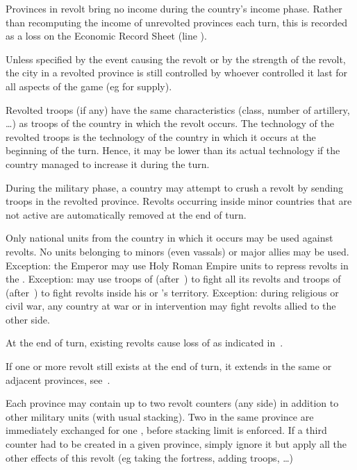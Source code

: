  Provinces in revolt bring no income during the
country's income phase. Rather than recomputing the income of unrevolted
provinces each turn, this is recorded as a loss on the Economic Record Sheet
(line ).

 Unless specified by the event causing the revolt or by
the strength of the revolt, the city in a revolted province is still
controlled by whoever controlled it last for all aspects of the game (eg for
supply).

\aparag[Technology] Revolted troops (if any) have the same characteristics
(class, number of artillery, \ldots) as troops of the country in which the
revolt occurs.
\bparag The technology of the revolted troops is the technology of the country
in which it occurs at the beginning of the turn. Hence, it may be lower than
its actual technology if the country managed to increase it during the turn.

 During the military phase, a country may attempt to
crush a revolt by sending troops in the revolted province.
\bparag Revolts occurring inside minor countries that are not active are
automatically removed at the end of turn.

\aparag Only national units from the country in which it occurs may be used
against revolts. No units belonging to minors (even vassals) or major allies
may be used.
\bparag Exception: the Emperor may use Holy Roman Empire units to repress
revolts in the \HRE.
\bparag Exception: \ANG may use troops of 
(after~) to fight all its revolts and troops of
 (after~) to fight revolts
inside his or 's territory.
\bparag Exception: during religious or civil war, any country at war or in
intervention may fight revolts allied to the other side.

 At the end of turn, existing revolts cause loss of
\STAB as indicated in~.

 If one or more revolt still exists at the end of
turn, it extends in the same or adjacent provinces,
see~.

 Each province may contain up to two revolt counters
(any side) in addition to other military units (with usual stacking).
\bparag Two \REVOLT\Facemoins in the same province are immediately exchanged
for one \REVOLT\Faceplus, before stacking limit is enforced.
\bparag If a third counter had to be created in a given province, simply
ignore it but apply all the other effects of this revolt (eg taking the
fortress, adding troops, \ldots)

